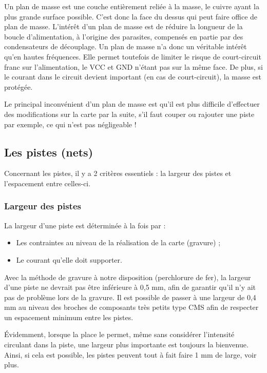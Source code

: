 \documentclass[a4paper]{article}
\begin{document}
Un plan de masse est une couche entièrement reliée à la masse, le cuivre ayant la plus grande surface possible. C'est donc la face du dessus qui peut faire office de plan de masse. L'intérêt d'un plan de masse est de réduire la longueur de la boucle d'alimentation, à l'origine des parasites, compensés en partie par des condensateurs de découplage. Un plan de masse n'a donc un véritable intérêt qu'en hautes fréquences. Elle permet toutefois de limiter le risque de court-circuit franc sur l'alimentation, le VCC et GND n'étant pas sur la même face. De plus, si le courant dans le circuit devient important (en cas de court-circuit), la masse est protégée.

Le principal inconvénient d'un plan de masse est qu'il est plus difficile d'effectuer des modifications sur la carte par la suite, s'il faut couper ou rajouter une piste par exemple, ce qui n'est pas négligeable !

\subsection{Les pistes (nets)}

Concernant les pistes, il y a 2 critères essentiels : la largeur des pistes et l'espacement entre celles-ci.

\subsubsection{Largeur des pistes}

La largeur d'une piste est déterminée à la fois par :

\begin{itemize}
	\item Les contraintes au niveau de la réalisation de la carte (gravure) ;
	\item Le courant qu'elle doit supporter.
\end{itemize}

Avec la méthode de gravure à notre disposition (perchlorure de fer), la largeur d'une piste ne devrait pas être inférieure à 0,5 mm, afin de garantir qu'il n'y ait pas de problème lors de la gravure. Il est possible de passer à une largeur de 0,4 mm au niveau des broches de composants très petits type CMS afin de respecter un espacement minimum entre les pistes.

Évidemment, lorsque la place le permet, même sans considérer l'intensité circulant dans la piste, une largeur plus importante est toujours la bienvenue. Ainsi, si cela est possible, les pistes peuvent tout à fait faire 1 mm de large, voir plus.
\end{document}
